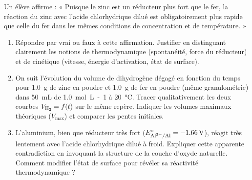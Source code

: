\documentclass[11pt]{article}
\begin{document}
\begin{exercice}
Un élève affirme : « Puisque le zinc est un réducteur plus fort que le fer, la réaction du zinc avec l'acide chlorhydrique dilué est obligatoirement plus rapide que celle du fer dans les mêmes conditions de concentration et de température. »
\begin{enumerate}
    \item Répondre par vrai ou faux à cette affirmation. Justifier en distinguant clairement les notions de thermodynamique (spontanéité, force du réducteur) et de cinétique (vitesse, énergie d'activation, état de surface).
    \item On suit l'évolution du volume de dihydrogène dégagé en fonction du temps pour \SI{1,0}{g} de zinc en poudre et \SI{1,0}{g} de fer en poudre (même granulométrie) dans \SI{50}{mL} de  \SI{1,0}{mol.L-1} à \SI{20}{\celsius}. Tracer qualitativement les deux courbes $V_{\ce{H2}} = f(t)$ sur le même repère. Indiquer les volumes maximaux théoriques ($V_{\text{max}}$) et comparer les pentes initiales.
    \item L'aluminium, bien que réducteur très fort ($E^\circ_{\ce{Al^{3+}/Al}} = -\SI{1,66}{V}$), réagit très lentement avec l'acide chlorhydrique dilué à froid. Expliquer cette apparente contradiction en invoquant la structure de la couche d'oxyde naturelle. Comment modifier l'état de surface pour révéler sa réactivité thermodynamique ?
\end{enumerate}
\end{exercice}
\end{document}
